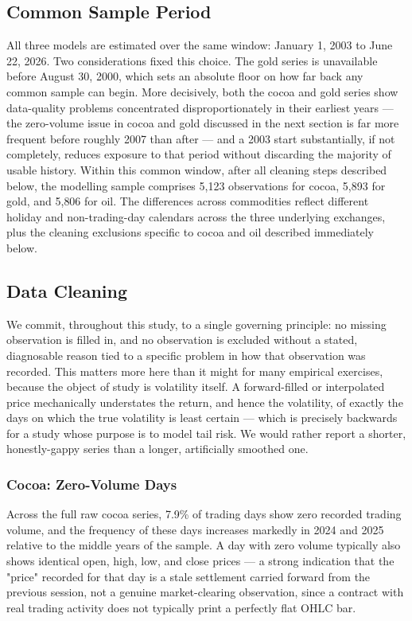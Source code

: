 \documentclass[preprint,12pt,authoryear]{elsarticle}
\begin{document}
\subsection{Common Sample Period}
\label{sec:sample}

All three models are estimated over the same window: January 1, 2003
to June 22, 2026. Two considerations fixed this choice. The gold
series is unavailable before August 30, 2000, which sets an absolute
floor on how far back any common sample can begin. More decisively,
both the cocoa and gold series show data-quality problems concentrated
disproportionately in their earliest years — the zero-volume issue in
cocoa and gold discussed in the next section is far more frequent
before roughly 2007 than after — and a 2003 start substantially, if
not completely, reduces exposure to that period without discarding
the majority of usable history. Within this common window, after all
cleaning steps described below, the modelling sample comprises 5{,}123
observations for cocoa, 5{,}893 for gold, and 5{,}806 for oil. The
differences across commodities reflect different holiday and
non-trading-day calendars across the three underlying exchanges, plus
the cleaning exclusions specific to cocoa and oil described
immediately below.

\subsection{Data Cleaning}
\label{sec:cleaning}

We commit, throughout this study, to a single governing principle:
no missing observation is filled in, and no observation is excluded
without a stated, diagnosable reason tied to a specific problem in
how that observation was recorded. This matters more here than it
might for many empirical exercises, because the object of study is
volatility itself. A forward-filled or interpolated price
mechanically understates the return, and hence the volatility, of
exactly the days on which the true volatility is least certain — which
is precisely backwards for a study whose purpose is to model tail
risk. We would rather report a shorter, honestly-gappy series than a
longer, artificially smoothed one.

\subsubsection{Cocoa: Zero-Volume Days}

Across the full raw cocoa series, 7.9\% of trading days show zero
recorded trading volume, and the frequency of these days increases
markedly in 2024 and 2025 relative to the middle years of the sample.
A day with zero volume typically also shows identical open, high, low,
and close prices — a strong indication that the "price" recorded for
that day is a stale settlement carried forward from the previous
session, not a genuine market-clearing observation, since a contract
with real trading activity does not typically print a perfectly flat
OHLC bar.
\end{document}
